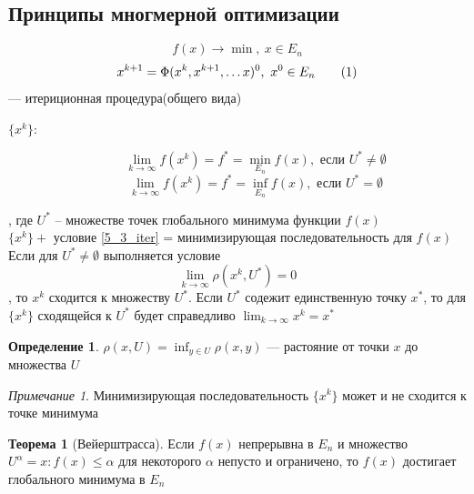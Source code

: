 \documentclass[oneside]{book}
\newcommand\addtag{\refstepcounter{equation}\tag{\theequation}}
\theoremstyle{plain}
\theoremstyle{remark}
\newtheorem*{remark}{Примечание}
\theoremstyle{definition}
\newtheorem{theorem}{Теорема}[section]
\newtheorem*{definition}{Определение}
\begin{document}
\subsection{Принципы многмерной оптимизации}
\label{sec:org7c29df4}
\[ f(x) \to \min,\ x \in E_n \]
\[ x^{k + 1} = \Phi(x^k, x^{k + 1}, \dots x)^0,\ x^0 \in E_n \addtag\label{5_3_iter} \]
--- итериционная процедура(общего вида)
\begin{description}
\item[{\(\{x^k\}\):}] \[ \lim_{k \to \infty} f(x^k) = f^* = \min_{E_n} f(x), \text{ если } U^* \neq \emptyset \]
\[ \lim_{k \to \infty} f(x^k) = f^* = \inf_{E_n} f(x), \text{ если } U^* = \emptyset \]
\end{description}
, где \(U^*\) -- множестве точек глобального минимума функции \(f(x)\) \\
\(\{x^k\} +\) условие \ref{5_3_iter} = минимизирующая последовательность для \(f(x)\) \\
Если для \(U^* \neq \emptyset\) выполняется условие
\[ \lim_{k \to \infty} \rho(x^k, U^*) = 0 \], то \(x^k\) сходится к множеству \(U^*\). Если \(U^*\) содежит единственную точку \(x^*\), то для \(\{x^k\}\) сходящейся к \(U^*\) будет справедливо \(\lim_{k \to \infty} x^k = x^*\)
\begin{definition}
\(\rho(x, U) = \inf_{y \in U}\rho(x, y)\) --- растояние от точки \(x\) до множества \(U\)
\end{definition}
\begin{remark}
Минимизирующая последовательность \(\{x^k\}\) может и не сходится к точке минимума
\end{remark}
\begin{theorem}[Вейерштрасса]
Если \(f(x)\) непрерывна в \(E_n\) и множество \(U^\alpha = {x: f(x) \le \alpha}\) для некоторого \(\alpha\) непусто и ограничено, то \(f(x)\) достигает глобального минимума в \(E_n\)
\end{theorem}
\end{document}
